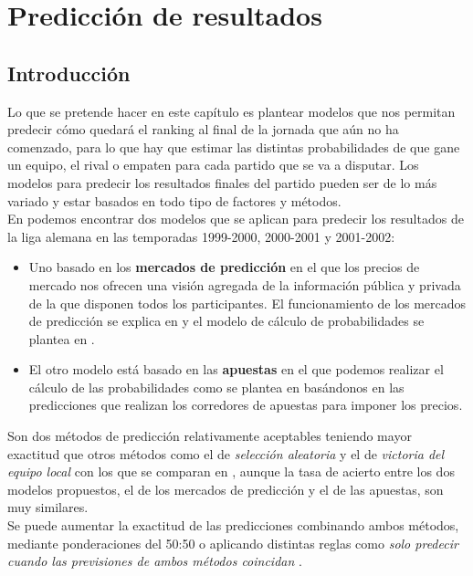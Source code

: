 \chapter{Predicción de resultados}

\section{Introducción}
Lo que se pretende hacer en este capítulo es plantear modelos que nos permitan predecir cómo quedará el ranking al final de la jornada que aún no ha comenzado, para lo que hay que estimar las distintas probabilidades de que gane un equipo, el rival o empaten para cada partido que se va a disputar. Los modelos para predecir los resultados finales del partido pueden ser de lo más variado y estar basados en todo tipo de factores y métodos.\\

En \cite{refpred1} podemos encontrar dos modelos que se aplican para predecir los resultados de la liga alemana en las temporadas 1999-2000, 2000-2001 y 2001-2002:
\begin{itemize}
	\item Uno basado en los \textbf{mercados de predicción} en el que los precios de mercado nos ofrecen una visión agregada de la información pública y privada de la que disponen todos los participantes. El funcionamiento de los mercados de predicción se explica en \cite[Tabla II]{refpred1} y el modelo de cálculo de probabilidades se plantea en \cite[pág 62]{refpred1}.
	\item El otro modelo está basado en las \textbf{apuestas} en el que podemos realizar el cálculo de las probabilidades como se plantea en \cite[págs 62, 63]{refpred1} basándonos en las predicciones que realizan los corredores de apuestas para imponer los precios.
\end{itemize}

Son dos métodos de predicción relativamente aceptables teniendo mayor exactitud que otros métodos como el de \textit{selección aleatoria} y el de \textit{victoria del equipo local} con los que se comparan en \cite[págs 64-66]{refpred1}, aunque la tasa de acierto entre los dos modelos propuestos, el de los mercados de predicción y el de las apuestas, son muy similares.\\
Se puede aumentar la exactitud de las predicciones combinando ambos métodos, mediante ponderaciones del 50:50 o aplicando distintas reglas como \textit{solo predecir cuando las previsiones de ambos métodos coincidan} \cite[págs 66-67]{refpred1}.\\


